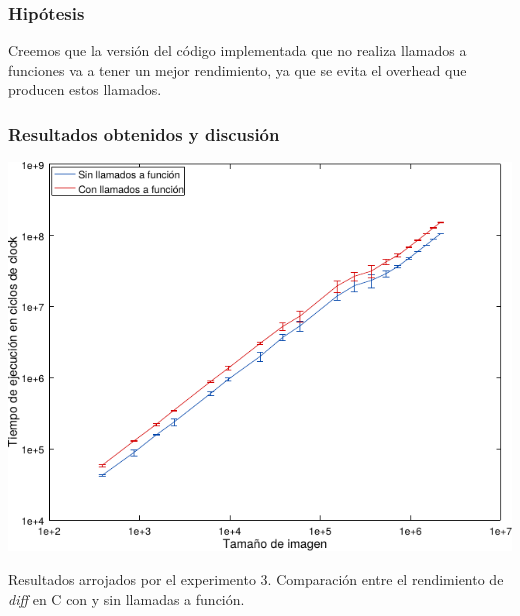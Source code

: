         \subsubsection*{Hipótesis}
             Creemos que la versión del código implementada que no realiza llamados a funciones va a tener un mejor rendimiento, ya que se evita el overhead que producen estos llamados.

        \subsubsection*{Resultados obtenidos y discusión}

            \noindent{} \begin{minipage}{\textwidth}
                \begin{center}
                    \vspace{1em}
                    \includegraphics{graficos/exp3-diff-c_vs_c2.pdf}
                    \vspace{1em}

                    Resultados arrojados por el experimento 3. Comparación entre el rendimiento de \emph{diff} en C con y sin llamadas a función.
                \end{center}
            \end{minipage}

